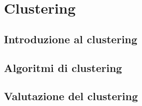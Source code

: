 
\chapter{Clustering}

\section{Introduzione al clustering}

\section{Algoritmi di clustering}


\section{Valutazione del clustering}
